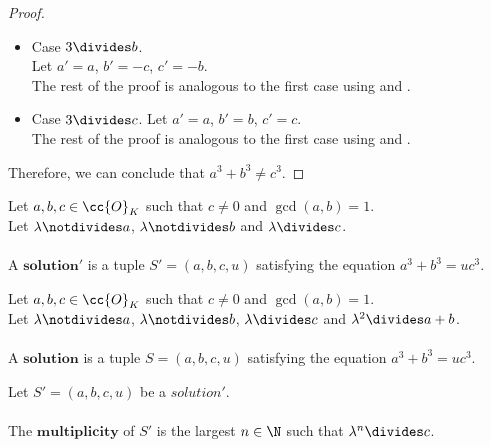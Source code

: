 \begin{proof}
\begin{itemize}
      \item Case $3 \divides b$. \\
      Let $a'=a$, $b'=-c$, $c'=-b$.\\
      The rest of the proof is analogous to the first case using  and
      .
      \item Case $3 \divides c$.
      Let $a'=a$, $b'=b$, $c'=c$.\\
      The rest of the proof is analogous to the first case using  and
      .
  \end{itemize}
  Therefore, we can conclude that $a^3 + b^3 \neq c^3$.
\end{proof}

\begin{definition}[Solution']
  \label{def:Solution1}
  \leanok
  Let $a, b, c \in \cc{O}_K$ such that $c \neq 0$ and $\gcd(a,b)=1$.\\
  Let $\lambda \notdivides a$, $\lambda \notdivides b$ and $\lambda \divides c$. \\\\
  A $\boldsymbol{solution'}$ is a tuple $S'=(a, b, c, u)$
  satisfying the equation $a^3 + b^3 = u c^3.$
\end{definition}

\begin{definition}[Solution]
  \label{def:Solution}
  \leanok
  Let $a, b, c \in \cc{O}_K$ such that $c \neq 0$ and $\gcd(a,b)=1$.\\
  Let $\lambda \notdivides a$, $\lambda \notdivides b$, $\lambda \divides c$ and
  $\lambda^2 \divides a+b$. \\\\
  A $\boldsymbol{solution}$ is a tuple $S=(a, b, c, u)$
  satisfying the equation $a^3 + b^3 = u c^3$.
\end{definition}

\begin{definition}
  \label{def:Solution1_Multiplicity}
  \leanok
  Let $S'=(a, b, c, u)$ be a $solution'$. \\\\
  The $\boldsymbol{multiplicity}$ of $S'$ is the largest $n \in \N$ such that
  $\lambda^n \divides c$.
\end{definition}

